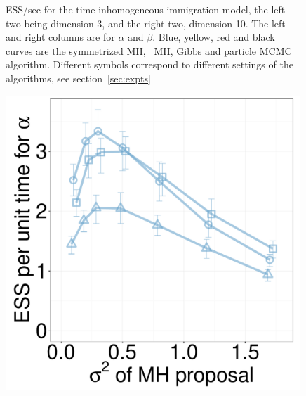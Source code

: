 \begin{figure}[H]
\begin{minipage}[hp]{0.24\linewidth}
	\end{minipage}
    \caption{ESS/sec for the time-inhomogeneous immigration model, the left two being dimension 3, and the right two, dimension 10. The left and right columns are for $\alpha$ and $\beta$. Blue, yellow, red and black curves are the symmetrized MH, \naive\ MH, Gibbs and particle MCMC algorithm. Different symbols correspond to different settings of the algorithms, see section~\ref{sec:expts}}
     \label{fig:ESS_pc_10}
  \end{figure}


  \begin{figure}[H]
  \centering
  \begin{minipage}[!hp]{0.24\linewidth}
  \centering
    \includegraphics [width=0.99\textwidth, angle=0]{figs/new_whole_exp_figs/mh_cq_alpha_dim3.pdf}
\end{minipage}
  \begin{minipage}[hp]{0.24\linewidth}
  \centering

\end{minipage}
\end{figure}
